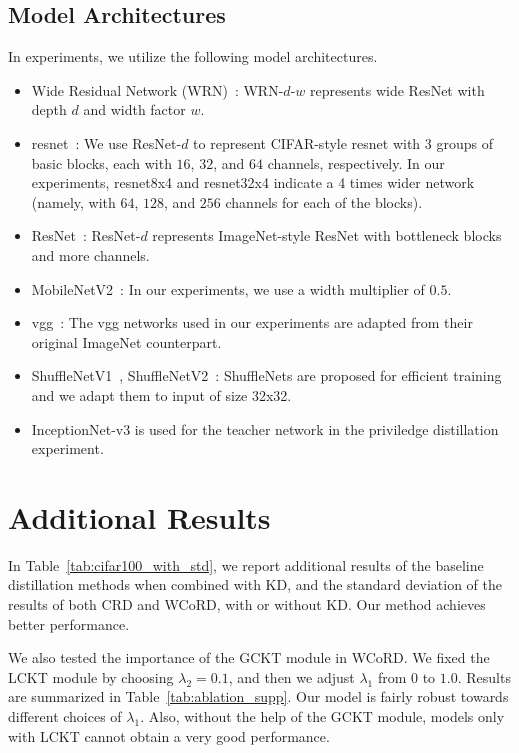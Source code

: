 \documentclass[final]{cvpr}
\theoremstyle{definition}
\begin{document}
\subsection{Model Architectures}
In experiments, we utilize the following model architectures.
\begin{itemize}
	\item Wide Residual Network (WRN)~\cite{zagoruyko2016wide}: WRN-$d$-$w$ represents wide ResNet with depth $d$ and width factor $w$.
	\item resnet~\cite{he2016deep}: We use ResNet-$d$ to represent CIFAR-style resnet with 3 groups of basic blocks, each with $16$, $32$, and $64$ channels, respectively. In our experiments, resnet8x4 and resnet32x4 indicate a 4 times wider network (namely, with $64$, $128$, and $256$ channels for each of the blocks).
\item ResNet~\cite{he2016deep}: ResNet-$d$ represents ImageNet-style ResNet with bottleneck blocks and more channels. \item MobileNetV2~\cite{sandler2018mobilenetv2}: In our experiments, we use a width multiplier of $0.5$.
	\item vgg~\cite{simonyan2014very}: The vgg networks used in our experiments are adapted from their original ImageNet counterpart.
	\item ShuffleNetV1~\cite{zhang2018shufflenet}, ShuffleNetV2~\cite{tan2019mnasnet}: ShuffleNets are proposed for efficient training and we adapt them to input of size 32x32.
	\item InceptionNet-v3 \cite{szegedy2016rethinking} is used for the teacher network in the priviledge distillation experiment.
\end{itemize}

\section{Additional Results}
In Table~\ref{tab:cifar100_with_std}, we report additional results of the baseline distillation methods when combined with KD, and the standard deviation of the results of both CRD and WCoRD, with or without KD. Our method achieves better performance.

We also tested the importance of the GCKT module in WCoRD. We fixed the LCKT module by choosing $\lambda_2=0.1$, and then we adjust $\lambda_1$ from $0$ to $1.0$. Results are summarized in Table~\ref{tab:ablation_supp}.
Our model is fairly robust towards different choices of $\lambda_1$. Also, without the help of the GCKT module, models only with LCKT cannot obtain a very good performance.
\end{document}
